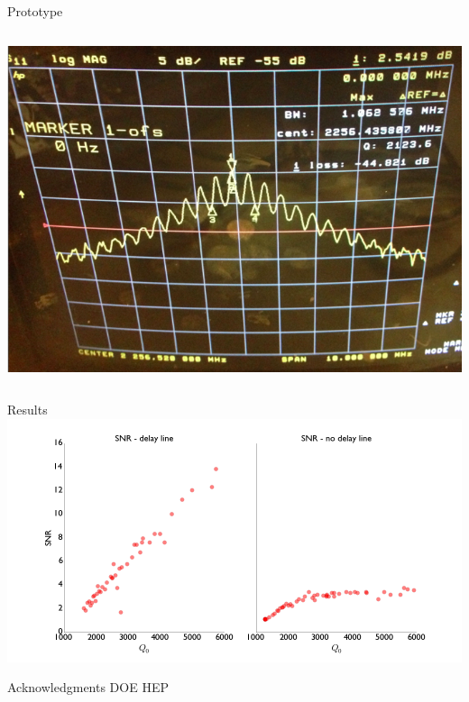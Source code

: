 \documentclass{beamer}
\begin{document}
\begin{frame}{Prototype}
\begin{columns}
\includegraphics[width=\textwidth]{s21_delay}
\end{columns}

\end{frame}

\begin{frame}{Results}
\includegraphics[width=\textwidth]{summary_plots}
\end{frame}

\begin{frame}{Acknowledgments}
DOE HEP
\end{frame}
\end{document}

